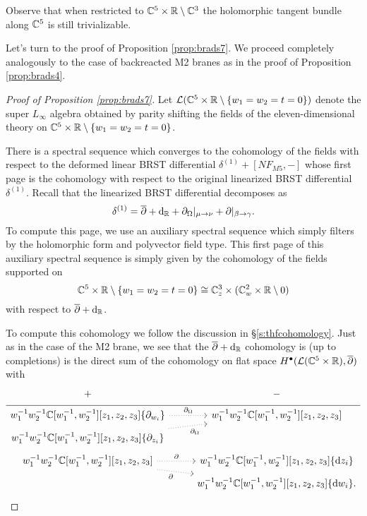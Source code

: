 Observe that when restricted to $\mathbb C^5 \times \mathbb R \setminus \mathbb C^3$ the holomorphic tangent bundle along $\mathbb C^5$ is still trivializable. 

\parsec[]

Let's turn to the proof of Proposition \ref{prop:brads7}.
We proceed completely analogously to the case of backreacted M2 branes as in the proof of Proposition \ref{prop:brads4}. 

\begin{proof}[Proof of Proposition \ref{prop:brads7}]
Let $\mathcal L (\mathbb C^5 \times \mathbb R \setminus \{w_1=w_2=t=0\})$ denote the super $L_\infty$ algebra obtained by parity shifting the fields of the eleven-dimensional theory on $\mathbb C^5 \times \mathbb R \setminus \{w_1=w_2=t=0\}$. 

There is a spectral sequence which converges to the cohomology of the fields with respect to the deformed linear BRST differential $\delta^{(1)} + [N F_{M5},-]$ whose first page
is the cohomology with respect to the original linearized BRST differential $\delta^{(1)}$. 
Recall that the linearized BRST differential decomposes as
\[
\delta^{(1)} = \overline{\partial} + {\rm d}_{\mathbb R} + \partial_{\Omega} |_{\mu \to \nu} + \partial |_{\beta \to \gamma}  .
\]
To compute this page, we use an auxiliary spectral sequence which simply filters by the holomorphic form and polyvector field type. 
This first page of this auxiliary spectral sequence is simply given by the cohomology of the fields supported on 
\[
\mathbb C^5 \times \mathbb R \setminus \{w_1=w_2=t=0\} \cong \mathbb C_z^3 \times (\mathbb C^2_w \times \mathbb R \setminus 0)
\]
with respect to $\overline{\partial} + {\rm d}_{\mathbb R}$. 

To compute this cohomology we follow the discussion in \S \ref{s:thfcohomology}.
Just as in the case of the M2 brane, we see that the $\overline{\partial} + {\rm d}_{\mathbb R}$ cohomology is (up to completions) is the direct sum of the cohomology on flat space $H^\bullet(\mathcal L(\mathbb C^5 \times \mathbb R), \overline{\partial})$ with
\begin{equation}
  \label{eqn:ads7ss2} 
  \begin{tikzcd}[row sep = 1 ex]
    + & - \\ \hline
w_1^{-1} w_2^{-1} \CC[w_1^{-1}, w_2^{-1}][z_1,z_2,z_3] \{\partial_{w_i}\}  \ar[r, dotted, "\div"] & w_1^{-1} w_2^{-1} \CC[w_1^{-1}, w_2^{-1}] [z_1,z_2,z_3] \\
w_1^{-1} w_2^{-1} \CC[w_1^{-1}, w_2^{-1}] [z_1,z_2,z_3] \{\del_{z_i}\} \ar[ur, dotted, "\div"'] \\
w_1^{-1} w_2^{-1} \CC[w_1^{-1}, w_2^{-1}] [z_1,z_2,z_3] \ar[r, dotted, "\del"] \ar[dr, dotted, "\del"'] & w_1^{-1} w_2^{-1} \CC[w_1^{-1}, w_2^{-1}][z_1,z_2,z_3] \{\d z_i\} \\ & w_1^{-1} w_2^{-1} \CC[w_1^{-1}, w_2^{-1}][z_1,z_2,z_3] \{\d w_i\} .
\end{tikzcd}
\end{equation}


\end{proof}
